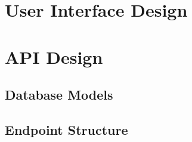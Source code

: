 \section{User Interface Design}



\section{API Design}


\subsection{Database Models}


\subsection{Endpoint Structure}